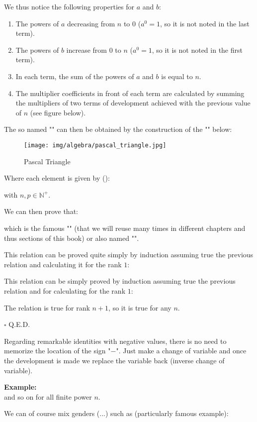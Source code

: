 	We thus notice the following properties for $a$ and $b$:
	\begin{enumerate}
		\item The powers of $a$ decreasing from $n$ to $0$ ($a^0=1$, so it is not noted in the last term).
		
		\item The powers of $b$ increase from $0$ to $n$ ($a^0=1$, so it is not noted in the first term).
		
		\item In each term, the sum of the powers of $a$ and $b$ is equal to $n$.
		
		\item The multiplier coefficients in front of each term are calculated by summing the multipliers of two terms of development achieved with the previous value of $n$ (see figure below).
	\end{enumerate}
	The so named "" can then be obtained by the construction of the "" below:
	\begin{figure}[H]
		\centering
		\texttt{[image: img/algebra/pascal\_triangle.jpg]}
		\caption{Pascal Triangle}
	\end{figure}
	Where each element is given by ():
	
	with $n,p\in \mathbb{N}^{+}$.
	\begin{theorem}
	We can then prove that:
	
	which is the famous "" (that we will reuse many times in different chapters and thus sections of this book) or also named "".
	\end{theorem}
	\begin{dem}
	This relation can be proved quite simply by induction assuming true the previous relation and calculating it for the rank $1$:
	
	This relation can be simply proved by induction assuming true the previous relation and for calculating for the rank $1$:
	
	The relation is true for rank $n + 1$, so it is true for any $n$.
	\begin{flushright}
		$\square$  Q.E.D.
	\end{flushright}
	\end{dem} 
	Regarding remarkable identities with negative values, there is no need to memorize the location of the sign "$-$". Just make a change of variable and once the development is made we replace the variable back (inverse change of variable).
	\begin{tcolorbox}[colframe=black,colback=white,sharp corners]
	\textbf{{\Large {}}Example:}\\
	
	and so on for all finite power $n$.
	\end{tcolorbox}
	We can of course mix genders (...) such as (particularly famous example):
	
